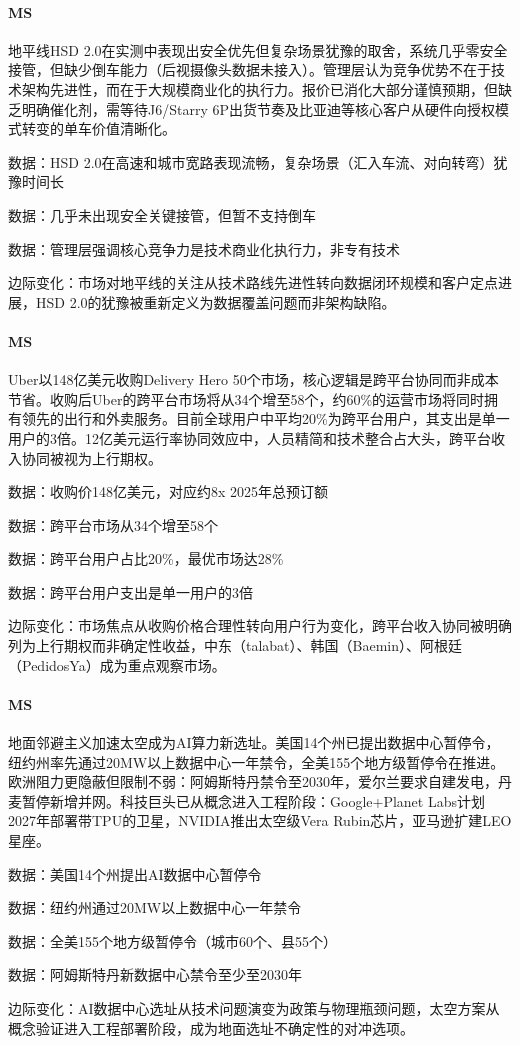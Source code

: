 \documentclass[11pt]{ctexart}
\begin{document}
\paragraph{MS} 地平线HSD 2.0在实测中表现出安全优先但复杂场景犹豫的取舍，系统几乎零安全接管，但缺少倒车能力（后视摄像头数据未接入）。管理层认为竞争优势不在于技术架构先进性，而在于大规模商业化的执行力。报价已消化大部分谨慎预期，但缺乏明确催化剂，需等待J6/Starry 6P出货节奏及比亚迪等核心客户从硬件向授权模式转变的单车价值清晰化。
{\small\color{refgray}数据：HSD 2.0在高速和城市宽路表现流畅，复杂场景（汇入车流、对向转弯）犹豫时间长\par}
{\small\color{refgray}数据：几乎未出现安全关键接管，但暂不支持倒车\par}
{\small\color{refgray}数据：管理层强调核心竞争力是技术商业化执行力，非专有技术\par}
{\small\color{refgray}边际变化：市场对地平线的关注从技术路线先进性转向数据闭环规模和客户定点进展，HSD 2.0的犹豫被重新定义为数据覆盖问题而非架构缺陷。\par}
\paragraph{MS} Uber以148亿美元收购Delivery Hero 50个市场，核心逻辑是跨平台协同而非成本节省。收购后Uber的跨平台市场将从34个增至58个，约60\%的运营市场将同时拥有领先的出行和外卖服务。目前全球用户中平均20\%为跨平台用户，其支出是单一用户的3倍。12亿美元运行率协同效应中，人员精简和技术整合占大头，跨平台收入协同被视为上行期权。
{\small\color{refgray}数据：收购价148亿美元，对应约8x 2025年总预订额\par}
{\small\color{refgray}数据：跨平台市场从34个增至58个\par}
{\small\color{refgray}数据：跨平台用户占比20\%，最优市场达28\%\par}
{\small\color{refgray}数据：跨平台用户支出是单一用户的3倍\par}
{\small\color{refgray}边际变化：市场焦点从收购价格合理性转向用户行为变化，跨平台收入协同被明确列为上行期权而非确定性收益，中东（talabat）、韩国（Baemin）、阿根廷（PedidosYa）成为重点观察市场。\par}
\paragraph{MS} 地面邻避主义加速太空成为AI算力新选址。美国14个州已提出数据中心暂停令，纽约州率先通过20MW以上数据中心一年禁令，全美155个地方级暂停令在推进。欧洲阻力更隐蔽但限制不弱：阿姆斯特丹禁令至2030年，爱尔兰要求自建发电，丹麦暂停新增并网。科技巨头已从概念进入工程阶段：Google+Planet Labs计划2027年部署带TPU的卫星，NVIDIA推出太空级Vera Rubin芯片，亚马逊扩建LEO星座。
{\small\color{refgray}数据：美国14个州提出AI数据中心暂停令\par}
{\small\color{refgray}数据：纽约州通过20MW以上数据中心一年禁令\par}
{\small\color{refgray}数据：全美155个地方级暂停令（城市60个、县55个）\par}
{\small\color{refgray}数据：阿姆斯特丹新数据中心禁令至少至2030年\par}
{\small\color{refgray}边际变化：AI数据中心选址从技术问题演变为政策与物理瓶颈问题，太空方案从概念验证进入工程部署阶段，成为地面选址不确定性的对冲选项。\par}
\end{document}

